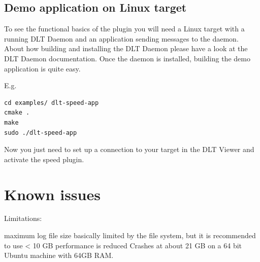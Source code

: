 \documentclass[a4paper,11pt]{article}
\begin{document}
\subsection{Demo application on Linux target}
To see the functional basics of the plugin you will need a Linux target with a running DLT Daemon and an application
sending messages to the daemon. About how building and installing the DLT Daemon please have a look at the DLT Daemon documentation.
Once the daemon is installed, building the demo application is quite easy.

E.g.
\begin{verbatim}
cd examples/ dlt-speed-app
cmake .
make
sudo ./dlt-speed-app
\end{verbatim}

Now you just need to set up a connection to your target in the DLT Viewer and activate the speed plugin.

\pagebreak
\section{Known issues}

Limitations:

maximum log file size basically limited by the file system, but it is recommended to use < 10 GB
performance is reduced
Crashes at about 21 GB on a 64 bit Ubuntu machine with 64GB RAM.

\end{document}
